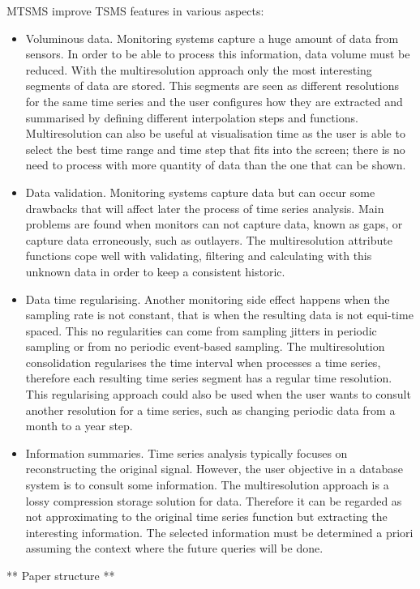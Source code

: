 MTSMS improve TSMS features in various aspects:
\begin{itemize}

\item Voluminous data. Monitoring systems capture a huge amount of
  data from sensors. In order to be able to process this information,
  data volume must be reduced. With the multiresolution approach only
  the most interesting segments of data are stored. This segments are
  seen as different resolutions for the same time series and the user
  configures how they are extracted and summarised by defining
  different interpolation steps and functions. Multiresolution can
  also be useful at visualisation time as the user is able to select
  the best time range and time step that fits into the screen; there
  is no need to process with more quantity of data than the one that
  can be shown.

\item Data validation. Monitoring systems capture data but can occur
  some drawbacks that will affect later the process of time series
  analysis. Main problems are found when monitors can not capture
  data, known as gaps, or capture data erroneously, such as outlayers.
  The multiresolution attribute functions cope well with validating,
  filtering and calculating with this unknown data in order to keep a
  consistent historic.

\item Data time regularising. Another monitoring side effect happens when
  the sampling rate is not constant, that is when the resulting data
  is not equi-time spaced. This no regularities can come from sampling
  jitters in periodic sampling or from no periodic event-based
  sampling. The multiresolution consolidation regularises the time
  interval when processes a time series, therefore each resulting time
  series segment has a regular time resolution. This regularising
  approach could also be used when the user wants to consult another
  resolution for a time series, such as changing periodic data from a
  month to a year step.

\item Information summaries. Time series analysis typically focuses on
  reconstructing the original signal. However, the user objective in a
  database system is to consult some information. The multiresolution
  approach is a lossy compression storage solution for data. Therefore
  it can be regarded as not approximating to the original time series
  function but extracting the interesting information. The selected
  information must be determined a priori assuming the context where
  the future queries will be done.

\end{itemize}





** Paper structure **\todo{}









